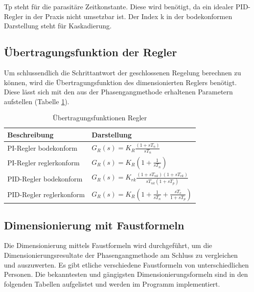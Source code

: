Tp steht für die parasitäre Zeitkonstante. Diese wird benötigt, da ein idealer PID-Regler in der Praxis nicht umsetzbar ist. Der Index k in der bodekonformen Darstellung steht für Kaskadierung.

\subsection{Übertragungsfunktion der Regler}
Um schlussendlich die Schrittantwort der geschlossenen Regelung berechnen zu können, wird die Übertragungsfunktion des dimensionierten Reglers benötigt. Diese lässt sich mit den aus der Phasengangmethode erhaltenen Parametern aufstellen (Tabelle \ref{ufunkregler}).\newline
\begin{table}
\centering
\renewcommand*{\arraystretch}{1.7}
\begin{tabular}{|l|l|}
\hline 
\textbf{Beschreibung} & \textbf{Darstellung} \\ 
\hline
PI-Regler bodekonform & $G_R(s)=K_R\frac{(1+sT_n)}{sT_n}$ \\ 
\hline 
PI-Regler reglerkonform & $G_R(s)=K_R\left(1+\frac{1}{sT_n}\right)$ \\ 
\hline 
PID-Regler bodekonform & $G_R(s)=K_{rk}\frac{(1+sT_{nk})(1+sT_{vk})}{sT_{nk}(1+sT_p)}$ \\ 
\hline 
PID-Regler reglerkonform & $G_R(s)=K_R\left(1+\frac{1}{sT_n}+\frac{sT_v}{1+sT_p}\right)$ \\ 
\hline 
\end{tabular} 
\renewcommand*{\arraystretch}{1}
\caption{Übertragungsfunktionen Regler}
\label{ufunkregler}
\end{table}

\newpage
\subsection{Dimensionierung mit Faustformeln}
Die Dimensionierung mittels Faustformeln wird durchgeführt, um die Dimensionierungsresultate der Phasengangmethode am Schluss zu vergleichen und auszuwerten. Es gibt etliche verschiedene Faustformeln von unterschiedlichen Personen. Die bekanntesten und gängigsten Dimensionierungsformeln sind in den folgenden Tabellen aufgelistet und werden im Programm implementiert.\\


